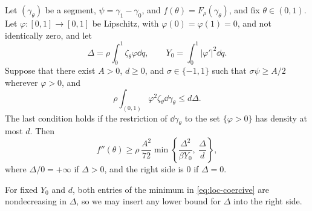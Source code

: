 \begin{lemma}
\label{lem:loc-coercive}
Let $(\gamma_\theta)$ be a segment, $\psi=\gamma_1-\gamma_0$, and
$f(\theta)=F_\rho(\gamma_\theta)$, and fix $\theta\in(0,1)$. Let
$\varphi:[0,1]\to[0,1]$ be Lipschitz, with $\varphi(0)=\varphi(1)=0$, and not
identically zero, and let
\[
 \Delta=\rho\int_0^1\zeta_\theta\varphi\dd q,\qquad
 Y_0=\int_0^1|\varphi'|^2\dd q .
\]
Suppose that there exist $A>0$, $d\ge0$, and $\sigma\in\{-1,1\}$ such that
$\sigma\psi\ge A/2$ wherever $\varphi>0$, and
\begin{equation}\label{eq:loc-weighted-density}
 \rho\int_{(0,1)}\varphi^2\zeta_\theta\dd\gamma_\theta\le d\Delta.
\end{equation}
The last condition holds if the restriction of $\dd\gamma_\theta$ to the set
$\{\varphi>0\}$ has density at most $d$. Then
\begin{equation}\label{eq:loc-coercive}
 f''(\theta)\ge\rho\,\frac{A^2}{72}
 \min\left\{\frac{\Delta^2}{\beta Y_0},\ \frac\Delta d\right\},
\end{equation}
where $\Delta/0=+\infty$ if $\Delta>0$, and the right side is $0$ if
$\Delta=0$.
\end{lemma}

For fixed $Y_0$ and $d$, both entries of the minimum in
\eqref{eq:loc-coercive} are nondecreasing in $\Delta$, so we may insert any
lower bound for $\Delta$ into the right side.

